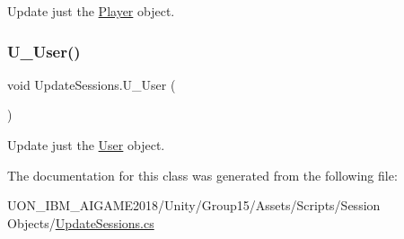 Update just the \mbox{\hyperlink{class_player}{Player}} object. 

\mbox{\label{class_update_sessions_adf570975af9bca48413a5d6b0cbf24b1}} 
\subsubsection{\texorpdfstring{U\_User()}{U\_User()}}
{\footnotesize\ttfamily void Update\+Sessions.\+U\+\_\+\+User (\begin{DoxyParamCaption}{ }\end{DoxyParamCaption})\hspace{0.3cm}{\ttfamily [inline]}}



Update just the \mbox{\hyperlink{class_user}{User}} object. 



The documentation for this class was generated from the following file\+:\begin{DoxyCompactItemize}
\item 
U\+O\+N\+\_\+\+I\+B\+M\+\_\+\+A\+I\+G\+A\+M\+E2018/\+Unity/\+Group15/\+Assets/\+Scripts/\+Session Objects/\mbox{\hyperlink{_update_sessions_8cs}{Update\+Sessions.\+cs}}\end{DoxyCompactItemize}
